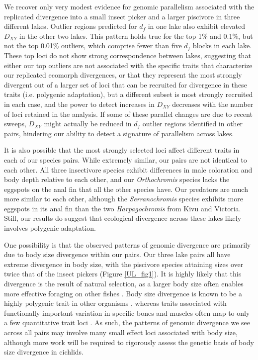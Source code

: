 We recover only very modest evidence for genomic parallelism associated with the replicated divergence into a small insect picker and a larger piscivore in three different lakes. Outlier regions predicted for $d_f$ in one lake also exhibit elevated $D_{XY}$ in the other two lakes. This pattern holds true for the top 1\% and 0.1\%, but not the top 0.01\% outliers, which comprise fewer than five $d_f$ blocks in each lake. These top loci do not show strong correspondence between lakes, suggesting that either our top outliers are not associated with the specific traits that characterize our replicated ecomorph divergences, or that they represent the most strongly divergent out of a larger set of loci that can be recruited for divergence in these traits (i.e. polygenic adaptation), but a different subset is most strongly recruited in each case, and the power to detect increases in $D_{XY}$ decreases with the number of loci retained in the analysis. If some of these parallel changes are due to recent sweeps, $D_{XY}$ might actually be reduced in $d_f$ outlier regions identified in other pairs, hindering our ability to detect a signature of parallelism across lakes.

It is also possible that the most strongly selected loci affect different traits in each of our species pairs. While extremely similar, our pairs are not identical to each other. All three insectivore species exhibit differences in male coloration and body depth relative to each other, and our {\em Orthochromis} species lacks the eggspots on the anal fin that all the other species have. Our predators are much more similar to each other, although the {\em Serranochromis} species exhibits more eggspots in its anal fin than the two {\em Harpagochromis} from Kivu and Victoria. Still, our results do suggest that ecological divergence across these lakes likely involves polygenic adaptation.

One possibility is that the observed patterns of genomic divergence are primarily due to body size divergence within our pairs. Our three lake pairs all have extreme divergence in body size, with the piscivore species attaining sizes over twice that of the insect pickers (Figure \ref{UL_fig1}). It is highly likely that this divergence is the result of natural selection, as a larger body size often enables more effective foraging on other fishes \cite{wainwright1995predicting}. Body size divergence is known to be a highly polygenic trait in other organisms \cite{turner2011population}, whereas traits associated with functionally important variation in specific bones and muscles often map to only a few quantitative trait loci \cite{arnegard2014genetics}. As such, the patterns of genomic divergence we see across all pairs may involve many small effect loci associated with body size, although more work will be required to rigorously assess the genetic basis of body size divergence in cichlids.

